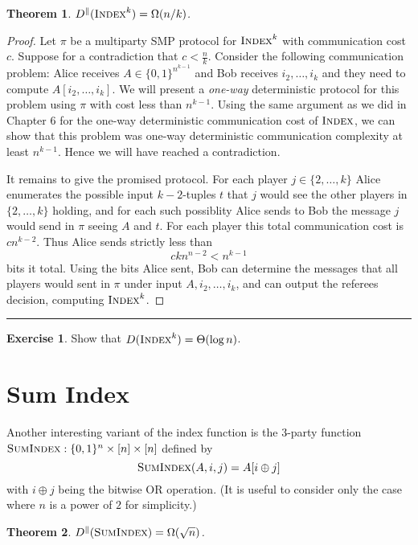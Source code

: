 \documentclass[11pt]{amsart}
\theoremstyle{plain}
\newtheorem{theorem}{Theorem}
\theoremstyle{definition}
\newtheorem{exercise}{Exercise}
\theoremstyle{plain}
\newcommand{\Index}{\textsc{Index}}
\newcommand{\SumIndex}{\textsc{SumIndex}}
\newcommand{\exercises}{\bigskip \noindent\rule{8cm}{0.4pt} \medskip}
\begin{document}
\begin{theorem}
$D^\parallel(\Index^k) = \Omega(n/k)$.
\end{theorem}

\begin{proof}
Let $\pi$ be a multiparty SMP protocol for $\Index^k$ with communication cost $c$. Suppose for a contradiction that $c < \frac{n}{k}$. Consider the following communication problem: Alice receives $A \in \{0,1\}^{n^{k-1}}$ and Bob receives $i_2,\dots, i_k$ and they need to compute $A[i_2,\dots, i_k]$. We will present a \emph{one-way} deterministic protocol for this problem using $\pi$ with cost less than $n^{k-1}$. Using the same argument as we did in Chapter $6$ for the one-way deterministic communication cost of $\Index$, we can show that this problem was one-way deterministic communication complexity at least $n^{{k-1}}$. Hence we will have reached a contradiction.

It remains to give the promised protocol. For each player $j \in \{2, \dots, k\}$ Alice enumerates the possible input $k-2$-tuples $t$ that $j$ would see the other players in $\{2,\dots, k\}$ holding, and for each such possiblity Alice sends to Bob the message $j$ would send in $\pi$ seeing $A$ and $t$. For each player this total communication cost is $cn^{k-2}$. Thus Alice sends strictly less than
$$ckn^{n-2} < n^{k-1}$$
bits it total.
Using the bits Alice sent, Bob can determine the messages that all players would sent in $\pi$ under input $A,i_2,\dots, i_k$, and can output the referees decision, computing $\Index^k$.
\end{proof}

\exercises

\begin{exercise}
Show that $D(\Index^k) = \Theta(\log n)$.
\end{exercise}


\newpage 
\section{Sum Index}

Another interesting variant of the index function is the 3-party function $\SumIndex : \{0,1\}^n \times [n] \times [n]$ defined by
\[
\SumIndex(A,i,j) = A[ i \oplus j]
\]
with $i \oplus j$ being the bitwise OR operation. (It is useful to consider only the case where $n$ is a power of $2$ for simplicity.)

\begin{theorem}
$D^\parallel(\SumIndex) = \Omega(\sqrt{n})$.
\end{theorem}
\end{document}
